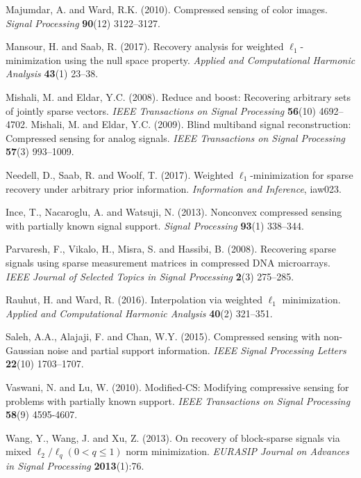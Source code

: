 \documentclass[11pt]{article}
\begin{document}
\begin{thebibliography}{}
	Majumdar, A. and Ward, R.K. (2010). Compressed sensing of color images. \textit{Signal Processing}
	\textbf{90}(12) 3122--3127.
	
	Mansour, H. and Saab, R. (2017). Recovery analysis for weighted $\ell_1$-minimization using the null space property. \textit{Applied and Computational Harmonic Analysis} \textbf{43}(1) 23--38.
	
	Mishali, M. and Eldar, Y.C. (2008). Reduce and boost: Recovering arbitrary sets of jointly sparse vectors. \textit{IEEE Transactions on Signal Processing} \textbf{56}(10) 4692--4702.
	Mishali, M. and Eldar, Y.C. (2009). Blind multiband signal reconstruction: Compressed sensing for analog signals. \textit{IEEE Transactions on Signal Processing} \textbf{57}(3) 993--1009.
	
	Needell, D., Saab, R. and Woolf, T. (2017). Weighted $\ell_1$-minimization for sparse recovery under arbitrary prior information. \textit{Information and Inference}, iaw023.
	
	Ince, T., Nacaroglu, A. and Watsuji, N. (2013). Nonconvex compressed sensing with partially known signal support.
	\textit{Signal Processing}
	\textbf{93}(1) 338--344.
	
	Parvaresh, F., Vikalo, H., Misra, S. and Hassibi, B. (2008). Recovering sparse signals using sparse measurement matrices in compressed DNA microarrays. \textit{IEEE Journal of Selected Topics in Signal Processing}
	\textbf{2}(3) 275--285.
	
	Rauhut, H. and Ward, R. (2016). Interpolation via weighted $\ell_1$ minimization. \textit{Applied and Computational Harmonic Analysis} \textbf{40}(2) 321--351.
	
	Saleh, A.A., Alajaji, F. and Chan, W.Y. (2015). Compressed sensing with non-Gaussian noise and partial support information.
	\textit{IEEE Signal Processing Letters}
	\textbf{22}(10) 1703--1707.
	
	Vaswani, N. and Lu, W. (2010). Modified-CS: Modifying compressive sensing for problems with partially known support. \textit{IEEE Transactions on Signal Processing}
	\textbf{58}(9) 4595-4607.

	Wang, Y., Wang, J. and Xu, Z. (2013). On recovery of block-sparse signals via mixed $\ell_2/\ell_q (0<q\leq1)$ norm minimization. \textit{EURASIP Journal on Advances in Signal Processing}
	\textbf{2013}(1):76.
	

\end{thebibliography}
\end{document}
